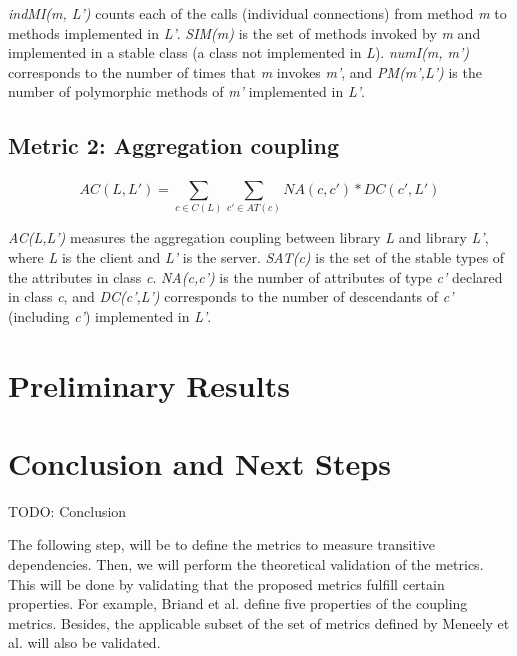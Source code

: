\documentclass[a4paper]{article}
\begin{document}
\textit{indMI(m, L')} counts each of the calls (individual connections) from method \textit{m} to methods implemented in \textit{L'}. \textit{SIM(m)} is the set of methods invoked by \textit{m} and implemented in a stable class (a class not implemented in \textit{L}). \textit{numI(m, m')} corresponds to the number of times that \textit{m} invokes \textit{m'}, and \textit{PM(m',L')} is the number of polymorphic methods of \textit{m'} implemented in \textit{L'}.

\subsection{Metric 2: Aggregation coupling}
\[
  AC(L,L') = \sum_{c \in C(L)}^{} \sum_{c' \in AT(c)}^{} NA(c, c')*DC(c', L')
\]

\textit{AC(L,L')} measures the aggregation coupling between library \textit{L} and library \textit{L'}, where \textit{L} is the client and \textit{L'} is the server. \textit{SAT(c)} is the set of the stable types of the attributes in class \textit{c}. \textit{NA(c,c')} is the number of attributes of type \textit{c'} declared in class \textit{c}, and \textit{DC(c',L')} corresponds to the number of descendants of \textit{c'} (including \textit{c'}) implemented in \textit{L'}.



\section{Preliminary Results}



\section{Conclusion and Next Steps}
TODO: Conclusion

The following step, will be to define the metrics to measure transitive dependencies. Then, we will perform the theoretical validation of the metrics. This will be done by validating that the proposed metrics fulfill certain properties. For example, Briand et al. \cite{briand1999unified} define five properties of the coupling metrics. Besides, the applicable subset of the set of metrics defined by Meneely et al. \cite{meneely2013validating} will also be validated.
\end{document}
